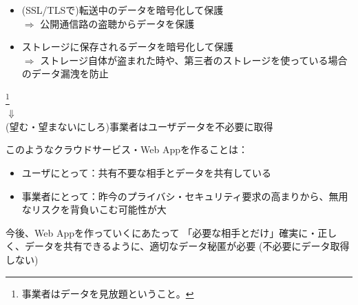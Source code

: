 \documentclass[12pt,dvipdfmx]{beamer}
\begin{document}
\begin{frame}
\begin{itemize}
 \item (SSL/TLSで)転送中のデータを暗号化して保護\\
 $\Rightarrow$ 公開通信路の盗聴からデータを保護
 \item ストレージに保存されるデータを暗号化して保護\\
 $\Rightarrow$ ストレージ自体が盗まれた時や、第三者のストレージを使っている場合のデータ漏洩を防止%
\end{itemize}
\begin{center}
 \footnote[frame]{事業者はデータを見放題ということ。}\\
 $\Downarrow$\\
 \alert{(望む・望まないにしろ)事業者はユーザデータを不必要に取得}
\end{center}
\end{frame}

\begin{frame}
このようなクラウドサービス・Web Appを作ることは：

\begin{itemize}
\item ユーザにとって：共有不要な相手とデータを共有している
\item 事業者にとって：昨今のプライバシ・セキュリティ要求の高まりから、\alert{無用なリスクを背負いこむ可能性が大}
\end{itemize}

\begin{alertblock}{\small 今後、Web Appを作っていくにあたって}
「必要な相手とだけ」確実に・正しく、データを共有できるように、適切なデータ秘匿が必要 (不必要にデータ取得しない)
\end{alertblock}
\end{frame}
\end{document}
